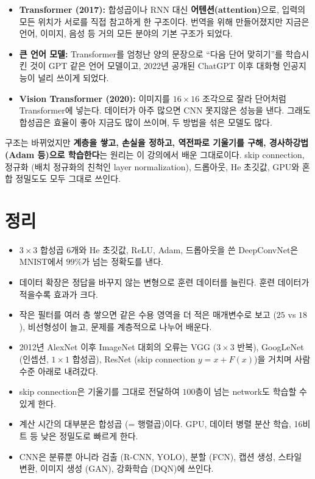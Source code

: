 \documentclass[11pt,a4paper]{article}
\begin{document}
\begin{remarkbox}[그 뒤의 딥러닝 (2017년 이후)]
\begin{itemize}[leftmargin=1.5em]
\item \textbf{Transformer (2017):} 합성곱이나 RNN 대신 \textbf{어텐션(attention)}으로, 입력의 모든 위치가 서로를 직접 참고하게 한 구조이다.
번역을 위해 만들어졌지만 지금은 언어, 이미지, 음성 등 거의 모든 분야의 기본 구조가 되었다.
\item \textbf{큰 언어 모델:} Transformer를 엄청난 양의 문장으로 ``다음 단어 맞히기''를 학습시킨 것이 GPT 같은 언어 모델이고,
2022년 공개된 ChatGPT 이후 대화형 인공지능이 널리 쓰이게 되었다.
\item \textbf{Vision Transformer (2020):} 이미지를 $16\times16$ 조각으로 잘라 단어처럼 Transformer에 넣는다.
데이터가 아주 많으면 CNN 못지않은 성능을 낸다. 그래도 합성곱은 효율이 좋아 지금도 많이 쓰이며, 두 방법을 섞은 모델도 많다.
\end{itemize}
구조는 바뀌었지만 \textbf{계층을 쌓고, 손실을 정하고, 역전파로 기울기를 구해, 경사하강법 (Adam 등)으로 학습한다}는 원리는
이 강의에서 배운 그대로이다. skip connection, 정규화 (배치 정규화의 친척인 layer normalization), 드롭아웃, He 초깃값,
GPU와 혼합 정밀도도 모두 그대로 쓰인다.
\end{remarkbox}

\section{정리}\label{sec:summary}

\begin{keybox}[딥러닝: 정리]
\begin{itemize}[leftmargin=1.5em]
\item $3\times3$ 합성곱 $6$개와 He 초깃값, ReLU, Adam, 드롭아웃을 쓴 DeepConvNet은 MNIST에서 $99\%$가 넘는 정확도를 낸다.
\item 데이터 확장은 정답을 바꾸지 않는 변형으로 훈련 데이터를 늘린다. 훈련 데이터가 적을수록 효과가 크다.
\item 작은 필터를 여러 층 쌓으면 같은 수용 영역을 더 적은 매개변수로 보고 ($25$ vs $18$), 비선형성이 늘고, 문제를 계층적으로 나누어 배운다.
\item 2012년 AlexNet 이후 ImageNet 대회의 오류는 VGG ($3\times3$ 반복), GoogLeNet (인셉션, $1\times1$ 합성곱),
ResNet (skip connection $y=x+F(x)$)을 거치며 사람 수준 아래로 내려갔다.
\item skip connection은 기울기를 그대로 전달하여 $100$층이 넘는 network도 학습할 수 있게 한다.
\item 계산 시간의 대부분은 합성곱 (= 행렬곱)이다. GPU, 데이터 병렬 분산 학습, 16비트 등 낮은 정밀도로 빠르게 한다.
\item CNN은 분류뿐 아니라 검출 (R-CNN, YOLO), 분할 (FCN), 캡션 생성, 스타일 변환, 이미지 생성 (GAN), 강화학습 (DQN)에 쓰인다.
\end{itemize}
\end{keybox}
\end{document}
